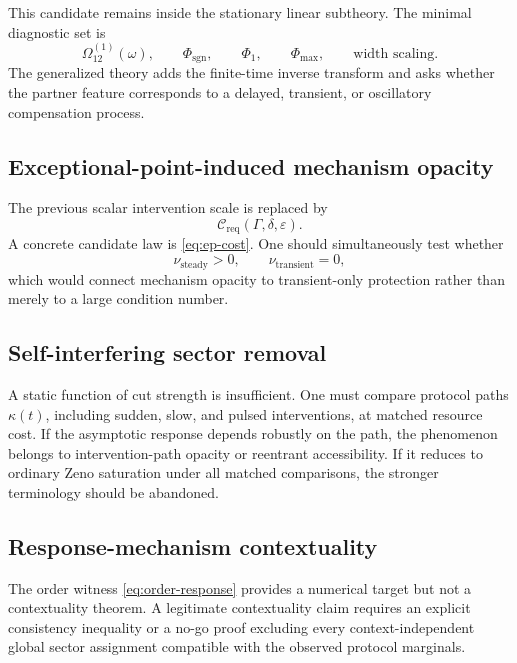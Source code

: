 \documentclass[11pt]{article}
\theoremstyle{definition}
\theoremstyle{remark}
\newcommand{\cC}{\mathcal C}
\newcommand{\PhiF}{\Phi}
\newcommand{\OmegaI}{\Omega}
\newcommand{\eps}{\varepsilon}
\begin{document}
This candidate remains inside the stationary linear subtheory. The minimal diagnostic set is
\begin{equation}
\OmegaI_{12}^{(1)}(\omega),
\qquad
\PhiF_{\mathrm{sgn}},
\qquad
\PhiF_{1},
\qquad
\PhiF_{\max},
\qquad
\text{width scaling}.
\end{equation}
The generalized theory adds the finite-time inverse transform and asks whether the partner feature corresponds to a delayed, transient, or oscillatory compensation process.

\subsection{Exceptional-point-induced mechanism opacity}

The previous scalar intervention scale is replaced by
\begin{equation}
\cC_{\mathrm{req}}(\Gamma,\delta,\eps).
\end{equation}
A concrete candidate law is \eqref{eq:ep-cost}. One should simultaneously test whether
\begin{equation}
\nu_{\mathrm{steady}}>0,
\qquad
\nu_{\mathrm{transient}}=0,
\end{equation}
which would connect mechanism opacity to transient-only protection rather than merely to a large condition number.

\subsection{Self-interfering sector removal}

A static function of cut strength is insufficient. One must compare protocol paths $\kappa(t)$, including sudden, slow, and pulsed interventions, at matched resource cost. If the asymptotic response depends robustly on the path, the phenomenon belongs to intervention-path opacity or reentrant accessibility. If it reduces to ordinary Zeno saturation under all matched comparisons, the stronger terminology should be abandoned.

\subsection{Response-mechanism contextuality}

The order witness \eqref{eq:order-response} provides a numerical target but not a contextuality theorem. A legitimate contextuality claim requires an explicit consistency inequality or a no-go proof excluding every context-independent global sector assignment compatible with the observed protocol marginals.
\end{document}
